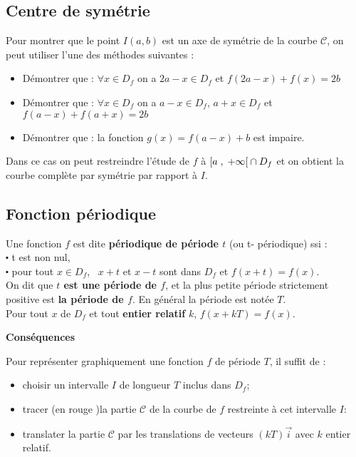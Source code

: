 \begin{example}
\subsection{Centre de symétrie}
Pour montrer que le point $ I(a, b) $ est un axe de symétrie de la courbe $ \mathcal{C} $,  on peut utiliser l'une des méthodes suivantes : 
\begin{itemize}
\item Démontrer que : $ \forall x\in D_{f}$  on a  $ 2a-x\in D_{f}$ et $ f(2a-x)+f(x)=2b $
\item Démontrer que : $ \forall x\in D_{f}$  on a   $ a-x\in D_{f}$,  $ a+x\in D_{f}$ et $ f(a-x)+f(a+x)=2b $
\item Démontrer que : la fonction $ g(x)=f(a-x)+b$ est impaire.
\end{itemize}
Dans ce cas on peut restreindre l'étude de $ f $ à $ \left[a \;,\; +\infty\right[\cap D_{f}$ et on obtient la courbe complète par symétrie par rapport à $ I. $

\subsection{Fonction périodique}
\begin{definition}
 Une fonction $ f $ est dite
\textbf{\color{magenta} périodique de période $ t $} (ou t- périodique) ssi :\\
 $ \centerdot $ t est non nul, \\
$ \centerdot $  pour tout $x\in D_{f} $, \   $  x+t$ et $ x-t$   sont dans $ D_{f} $           et  $f(x+t)=f(x) $.\\
On dit que \textbf{\color{magenta} $t$ est une période de $f$}, et la plus petite période strictement positive est  \textbf{\color{magenta} la période de $f$}.  En général la période est notée $ T $. \\
Pour tout $x$ de $ D_{f} $ et tout \textbf{\color{magenta} entier relatif } $ k $, \colorbox{gray!20!}{$ f(x+kT) = f(x) $. }
\end{definition}

\textbf{\color{blue}Conséquences}

Pour représenter graphiquement une fonction $ f $ de période $ T $, il suffit de :
\begin{itemize}
\item choisir un intervalle $ I $ de longueur $ T $ inclus dans $ D_{f} $;
\item tracer (en rouge )la partie $ \mathcal{C} $ de la courbe de $ f $ restreinte à cet intervalle $ I: $
\item translater la partie $ \mathcal{C} $ par les translations de vecteurs $ (kT)\overrightarrow{i} $ avec $ k $ entier relatif.
\end{itemize}
\end{example}
